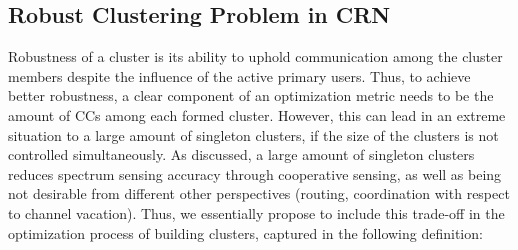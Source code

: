 \documentclass[times]{ettauth}
\newcommand{\ie}{i.e., }
\theoremstyle{mytheoremstyle}
\theoremstyle{mytheoremstyle}
\theoremstyle{mytheoremstyle}
\begin{document}
\subsection{Robust Clustering Problem in CRN}
\label{problem}


Robustness of a cluster is its ability to uphold communication among the cluster members despite the influence of the active primary users.
Thus, to achieve better robustness, a clear component of an optimization metric needs to be the amount of CCs among each formed cluster. 
However, this can lead in an extreme situation to a large amount of singleton clusters, if the size of the clusters is not controlled simultaneously. 
As discussed, a large amount of singleton clusters reduces spectrum sensing accuracy through cooperative sensing, as well as being not desirable from different other perspectives (routing, coordination with respect to channel vacation).
Thus, we essentially propose to include this trade-off in the optimization process of building clusters, captured in the following definition:
\end{document}
